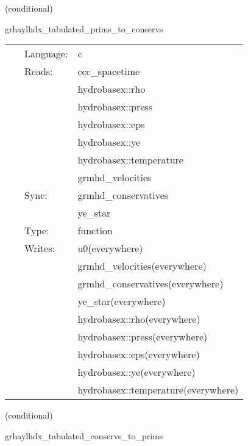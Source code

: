 \vspace{5mm}

   (conditional) 

\hspace{5mm} grhaylhdx\_tabulated\_prims\_to\_conservs 

\hspace{5mm}{\it tabulated version of grhaylhdx\_prims\_to\_conservs } 


\hspace{5mm}

 \begin{tabular*}{160mm}{cll} 
~ & Language:  & c \\ 
~ & Reads:  & ccc\_spacetime \\ 
~& ~ &hydrobasex::rho\\ 
~& ~ &hydrobasex::press\\ 
~& ~ &hydrobasex::eps\\ 
~& ~ &hydrobasex::ye\\ 
~& ~ &hydrobasex::temperature\\ 
~& ~ &grmhd\_velocities\\ 
~ & Sync:  & grmhd\_conservatives \\ 
~& ~ &ye\_star\\ 
~ & Type:  & function \\ 
~ & Writes:  & u0(everywhere) \\ 
~& ~ &grmhd\_velocities(everywhere)\\ 
~& ~ &grmhd\_conservatives(everywhere)\\ 
~& ~ &ye\_star(everywhere)\\ 
~& ~ &hydrobasex::rho(everywhere)\\ 
~& ~ &hydrobasex::press(everywhere)\\ 
~& ~ &hydrobasex::eps(everywhere)\\ 
~& ~ &hydrobasex::ye(everywhere)\\ 
~& ~ &hydrobasex::temperature(everywhere)\\ 
\end{tabular*} 


\vspace{5mm}

   (conditional) 

\hspace{5mm} grhaylhdx\_tabulated\_conservs\_to\_prims 

\hspace{5mm}{\it tabulated version of grhaylhdx\_conservs\_to\_prims } 


